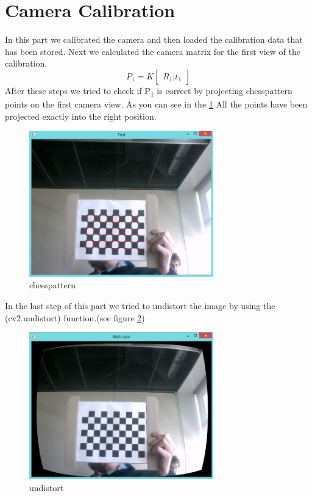 \section{Camera Calibration}
In this part we calibrated the camera and then loaded the calibration data that has been stored. Next we calculated the camera matrix for the first view of the calibration.
\begin{equation}
	P_{1} = K
	\begin{bmatrix} R_{1}|t_{1} \end{bmatrix}
\end{equation}
 After these steps we tried to check if P\textsubscript{1} is correct by projecting chesspattern points on the first camera view. As you can see in the \ref{fig:chesspattern} All the points have been projected exactly into the right position.
 
 \begin{figure}[h!]
	\centering
	\includegraphics[width=8cm]{Handin3/images/patterndot.jpg}
	\caption{chesspattern}
	\label{fig:chesspattern}
\end{figure}
 
 In the last step of this part we tried to undistort the image by using the (cv2.undistort) function.(see figure \ref{fig:undistort})
 
 \begin{figure}[h!]
	\centering
	\includegraphics[width=8cm]{Handin3/images/undistort.jpg}
	\caption{undistort}
	\label{fig:undistort}
\end{figure}
 
